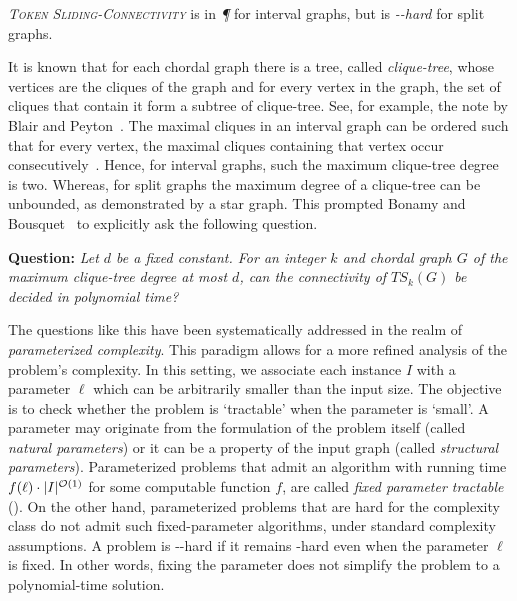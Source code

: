 \begin{proposition*}
\label{prop:token-sliding-known-results}
\emph{\textsc{Token Sliding-Connectivity}}
is in \emph{\P} for interval graphs, but
is \emph{\co-\NP-hard}
for split graphs.
\end{proposition*}

It is known that for each chordal graph there is a tree, 
called \emph{clique-tree}, whose
vertices are the cliques of the graph and for every vertex 
in the graph, the set of cliques that contain it form a subtree of clique-tree.
See, for example, the note by Blair and Peyton~\cite{10.1007/978-1-4613-8369-7_1}.
The maximal cliques in an interval graph can be ordered such 
that for every vertex, the maximal cliques containing that vertex occur consecutively~\cite{DBLP:journals/algorithmica/GalbyMSST24}.
Hence, for interval graphs, such the maximum clique-tree degree is two.
Whereas, for split graphs the maximum degree of a clique-tree 
can be unbounded, as demonstrated by a star graph.
This prompted Bonamy and Bousquet~\cite{DBLP:conf/wg/BonamyB17}
to explicitly ask the following question.

\smallskip
\noindent \textbf{Question:} \emph{Let $d$ be a fixed constant. 
For an integer $k$ and chordal graph $G$ of the maximum
clique-tree degree at most $d$, 
can the connectivity of $TS_k(G)$ be decided in polynomial time?}
\smallskip

The questions like this have been systematically addressed in the realm 
of \emph{parameterized complexity}.
This paradigm allows for a more refined analysis of the problem’s complexity.
In this setting, we associate each instance $I$ with a parameter $\ell$
which can be arbitrarily smaller than the input size.
The objective is to check whether the problem is `tractable' when 
the parameter is `small'.
A parameter may originate from the formulation of the problem itself (called \emph{natural parameters}) or it can be a property of the input graph (called \emph{structural parameters}).
Parameterized problems that admit an algorithm with running time
$f(\ell) \cdot |I|^{\mathcal{O}(1)}$ for some computable function $f$, are called 
\emph{fixed parameter tractable} (\FPT).
On the other hand, parameterized problems that are hard for the complexity class \W[1] do not admit such fixed-parameter algorithms,
under standard complexity assumptions.
A problem is \para-\NP-hard if it remains \NP-hard even when the parameter 
$\ell$ is fixed. 
In other words, fixing the parameter does not simplify the problem to a
polynomial-time solution.


